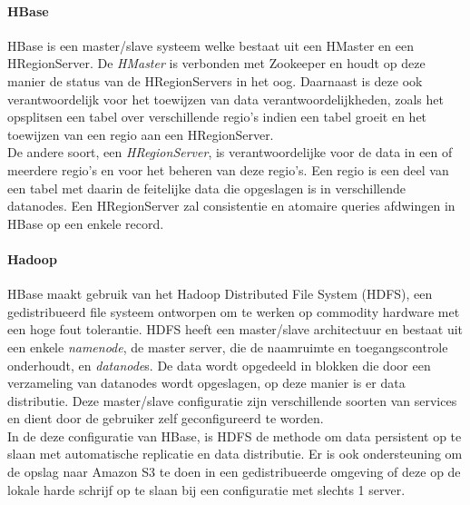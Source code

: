 \paragraph{HBase\cite{george2011hbase}} HBase is een master/slave systeem welke bestaat uit een HMaster en een HRegionServer. De \textit{HMaster} is verbonden met Zookeeper en houdt op deze manier de status van de HRegionServers in het oog. Daarnaast is deze ook verantwoordelijk voor het toewijzen van data verantwoordelijkheden, zoals het opsplitsen een tabel over verschillende regio's indien een tabel groeit en het toewijzen van een regio aan een HRegionServer.\\
De andere soort, een \textit{HRegionServer}, is verantwoordelijke voor de data in een of meerdere regio's en voor het beheren van deze regio's. Een regio is een deel van een tabel met daarin de feitelijke data die opgeslagen is in verschillende datanodes. Een HRegionServer zal consistentie en atomaire queries afdwingen in HBase op een enkele record.  

\paragraph{Hadoop\cite{borthakur2007hadoop}} HBase maakt gebruik van het Hadoop Distributed File System (HDFS), een gedistribueerd file systeem ontworpen om te werken op commodity hardware met een hoge fout tolerantie. HDFS heeft een master/slave architectuur en bestaat uit een enkele \textit{namenode}, de master server, die de naamruimte en toegangscontrole onderhoudt, en \textit{datanode}s. De data wordt opgedeeld in blokken die door een verzameling van datanodes wordt opgeslagen, op deze manier is er data distributie. Deze master/slave configuratie zijn verschillende soorten van services en dient door de gebruiker zelf geconfigureerd te worden. \\
In de deze configuratie van HBase, is HDFS de methode om data persistent op te slaan met automatische replicatie en data distributie. Er is ook ondersteuning om de opslag naar Amazon S3 te doen in een gedistribueerde omgeving of deze op de lokale harde schrijf op te slaan bij een configuratie met slechts 1 server.\cite{george2011hbase}

